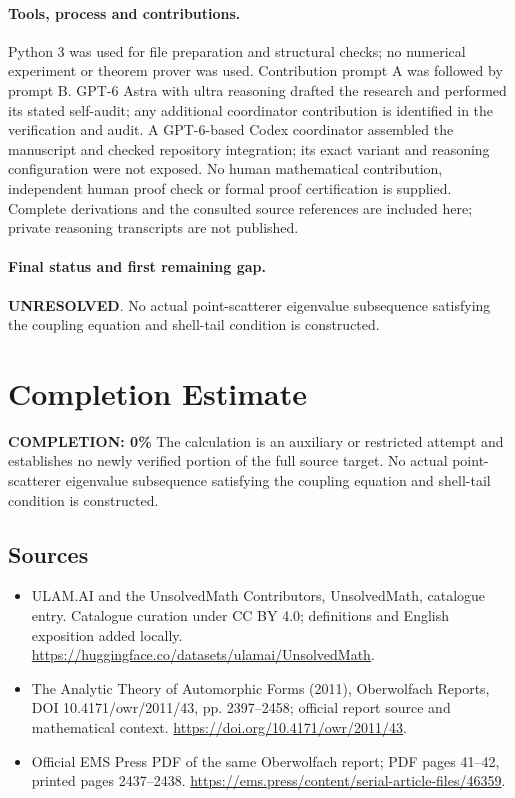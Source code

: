 \documentclass[11pt]{article}
\begin{document}
\paragraph{Tools, process and contributions.}
Python 3 was used for file preparation and structural checks; no numerical experiment or theorem prover was used. Contribution prompt A was followed by prompt B. GPT-6 Astra with ultra reasoning drafted the research and performed its stated self-audit; any additional coordinator contribution is identified in the verification and audit. A GPT-6-based Codex coordinator assembled the manuscript and checked repository integration; its exact variant and reasoning configuration were not exposed. No human mathematical contribution, independent human proof check or formal proof certification is supplied. Complete derivations and the consulted source references are included here; private reasoning transcripts are not published.

\paragraph{Final status and first remaining gap.}
\textbf{UNRESOLVED}. No actual point-scatterer eigenvalue subsequence satisfying the coupling equation and shell-tail condition is constructed.

\section{Completion Estimate}
\noindent\textbf{COMPLETION: 0\%}
The calculation is an auxiliary or restricted attempt and establishes no newly verified portion of the full source target. No actual point-scatterer eigenvalue subsequence satisfying the coupling equation and shell-tail condition is constructed.

\subsection{Sources}
\begin{itemize}
\item[\hypertarget{source:statement:1}{S1}] ULAM.AI and the UnsolvedMath Contributors, UnsolvedMath, catalogue entry. Catalogue curation under CC BY 4.0; definitions and English exposition added locally.
\url{https://huggingface.co/datasets/ulamai/UnsolvedMath}.
\item[\hypertarget{source:statement:2}{S2}] The Analytic Theory of Automorphic Forms (2011), Oberwolfach Reports, DOI 10.4171/owr/2011/43, pp. 2397--2458; official report source and mathematical context.
\url{https://doi.org/10.4171/owr/2011/43}.
\item[\hypertarget{source:statement:3}{S3}] Official EMS Press PDF of the same Oberwolfach report; PDF pages 41--42, printed pages 2437--2438.
\url{https://ems.press/content/serial-article-files/46359}.
\end{itemize}
\label{end:statement}
\end{document}
